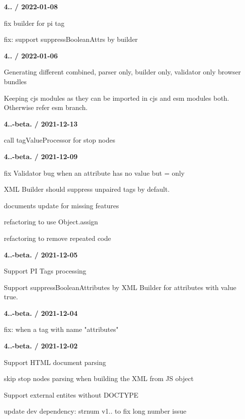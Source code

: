 {\bfseries{4.. / 2022-\/01-\/08}}
\begin{DoxyItemize}
\item fix builder for pi tag
\item fix\+: support suppress\+Boolean\+Attrs by builder
\end{DoxyItemize}

{\bfseries{4.. / 2022-\/01-\/06}}
\begin{DoxyItemize}
\item Generating different combined, parser only, builder only, validator only browser bundles
\item Keeping cjs modules as they can be imported in cjs and esm modules both. Otherwise refer {\ttfamily esm} branch.
\end{DoxyItemize}

{\bfseries{4..-\/beta. / 2021-\/12-\/13}}
\begin{DoxyItemize}
\item call tag\+Value\+Processor for stop nodes
\end{DoxyItemize}

{\bfseries{4..-\/beta. / 2021-\/12-\/09}}
\begin{DoxyItemize}
\item fix Validator bug when an attribute has no value but \textquotesingle{}=\textquotesingle{} only
\item XML Builder should suppress unpaired tags by default.
\item documents update for missing features
\item refactoring to use Object.\+assign
\item refactoring to remove repeated code
\end{DoxyItemize}

{\bfseries{4..-\/beta. / 2021-\/12-\/05}}
\begin{DoxyItemize}
\item Support PI Tags processing
\item Support {\ttfamily suppress\+Boolean\+Attributes} by XML Builder for attributes with value {\ttfamily true}.
\end{DoxyItemize}

{\bfseries{4..-\/beta. / 2021-\/12-\/04}}
\begin{DoxyItemize}
\item fix\+: when a tag with name "{}attributes"{}
\end{DoxyItemize}

{\bfseries{4..-\/beta. / 2021-\/12-\/02}}
\begin{DoxyItemize}
\item Support HTML document parsing
\item skip stop nodes parsing when building the XML from JS object
\item Support external entites without DOCTYPE
\item update dev dependency\+: strnum v1.. to fix long number issue
\end{DoxyItemize}

